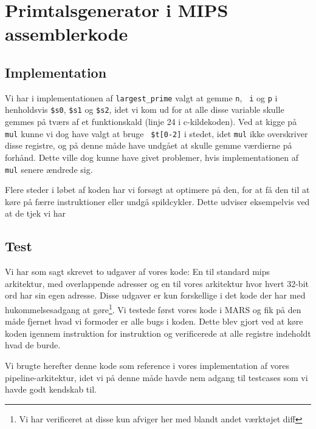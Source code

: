 \section{Primtalsgenerator i MIPS assemblerkode}
\subsection{Implementation}
Vi har i implementationen af {\tt largest\_prime} valgt at gemme {\tt n}, {\tt
i} og {\tt p} i henholdsvis {\tt \$s0}, {\tt \$s1} og {\tt \$s2}, idet vi kom ud
for at alle disse variable skulle gemmes på tværs af et funktionskald (linje 24
i c-kildekoden). Ved at kigge på {\tt mul} kunne vi dog have valgt at bruge {\tt
\$t[0-2]} i stedet, idet {\tt mul} ikke overskriver disse registre, og på denne
måde have undgået at skulle gemme værdierne på forhånd. Dette ville dog kunne
have givet problemer, hvis implementationen af {\tt mul} senere ændrede sig.

Flere steder i løbet af koden har vi forsøgt at optimere på den, for at få den
til at køre på færre instruktioner eller undgå spildcykler. Dette udviser eksempelvis
ved at de tjek vi har

\subsection{Test}
Vi har som sagt skrevet to udgaver af vores kode: En til standard mips
arkitektur, med overlappende adresser og en til vores arkitektur hvor hvert
32-bit ord har sin egen adresse. Disse udgaver er kun forskellige i det kode der
har med hukommelsesadgang at gøre\footnote{Vi har verificeret at disse kun
afviger her med blandt andet værktøjet diff}. Vi testede først vores kode i MARS
og fik på den måde fjernet hvad vi formoder er alle bugs i koden. Dette blev
gjort ved at køre koden igennem instruktion for instruktion og verificerede at
alle registre indeholdt hvad de burde.

Vi brugte herefter denne kode som reference i vores implementation af vores
pipeline-arkitektur, idet vi på denne måde havde nem adgang til testcases som vi
havde godt kendskab til.
